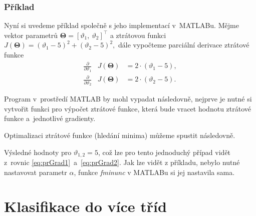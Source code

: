 \subsubsection*{Příklad}
\par{Nyní si uvedeme příklad společně s jeho implementací v~MATLABu. Mějme vektor parametrů $\bm{\Theta} = \left[ \vartheta_1,~\vartheta_2 \right]^{\top}$ a ztrátovou funkci $J \left( \bm{\Theta} \right) = \left( \vartheta_1 - 5 \right)^2 + \left( \vartheta_2 - 5 \right)^2,$ dále vypočteme parciální derivace ztrátové funkce
\begin{eqnarray}
	\label{eq:prGrad1}
	\frac{\partial}{\partial \vartheta_1} &J \left( \bm{\Theta} \right) &= 2 \cdot \left( \vartheta_1 - 5 \right),\\
	\label{eq:prGrad2}
	\frac{\partial}{\partial \vartheta_2} &J \left( \bm{\Theta} \right) &= 2 \cdot \left( \vartheta_2 - 5 \right).
\end{eqnarray}}

\par{Program v~prostředí MATLAB by mohl vypadat následovně, nejprve je nutné si vytvořit funkci pro výpočet ztrátové funkce, která bude vracet hodnotu ztrátové funkce a~jednotlivé gradienty.
}
\newpage


\par{Optimalizaci ztrátové funkce (hledání minima) můžeme spustit následovně.

Výsledné hodnoty pro $\vartheta_{1,2} = 5$, což lze pro tento jednoduchý případ vidět z~rovnic \ref{eq:prGrad1}~a~\ref{eq:prGrad2}. Jak lze vidět z příkladu, nebylo nutné nastavovat parametr $\alpha$, funkce \textit{fminunc} v MATLABu si jej nastavila sama.}




\newpage














\section{Klasifikace do více tříd}
\label{sec:BinarniRegreseKlasifikaceDoViceTrid}

